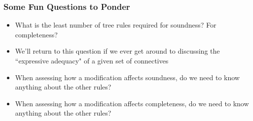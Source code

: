 \begin{frame}
\frametitle{Some Fun Questions to Ponder}

\begin{itemize}[<+->]

\item What is the least number of tree rules required for soundness? For completeness?

\bi

\item We'll return to this question if we ever get around to discussing the ``expressive adequacy" of a given set of connectives

\ei

\bigskip

\item When assessing how a modification affects soundness, do we need to know anything about the other rules? 

\item When assessing how a modification affects completeness, do we need to know anything about the other rules? 

\end{itemize}
\end{frame}


\iffalse

\begin{frame}
\frametitle{Recall STD:}

  \begin{itemize}[<+->]
    \item d
    \emph{d} ($\enot$, $\eor$, $\eand$, $\eif$, $\eiff$)
  
  \begin{block}{blah}
    \begin{itemize}[<+->]
      \item[] d

  \item[] d

  \item[] d
\end{itemize} 
\end{block}

  \begin{definition}
  d
  \end{definition}


\end{itemize}
\end{frame}

\fi 